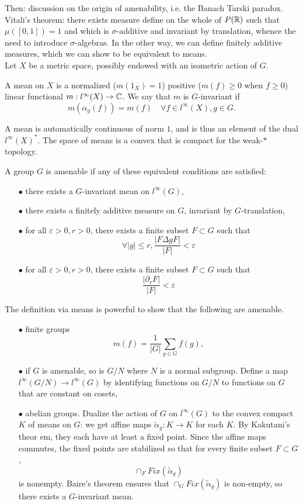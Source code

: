 Then: discussion on the origin of amenability, i.e. the Banach Tarski paradox. Vitali's theorem: there exists measure define on the whole of $P(\mathbb R)$ such that $\mu([0,1]) = 1$ and which is $\sigma$-additive and invariant by translation, whence the need to introduce $\sigma$-algebras. In the other way, we can define finitely additive measures, which we can show to be equivalent to means.\\

Let $X$ be a metric space, possibly endowed with an isometric action of $G$.

\begin{definition}
A mean on $X$ is a normalized ($m(1_X)=1$) positive ($m(f)\geq 0$ when $f\geq 0$) linear functional $m: l^\infty(X)\rightarrow \mathbb C$. We say that $m$ is $G$-invariant if 
\[m(\alpha_g(f))=m(f) \quad \forall f\in l^\infty (X), g\in G.\] 
\end{definition}

A mean is automatically continuous of norm $1$, and is thus an element of the dual $l^\infty(X)^*$. The space of means is a convex that is compact for the weak-$*$ topology.

\begin{definition}
A group $G$ is amenable if any of these equivalent conditions are satisfied:
\begin{itemize}
\item[$\bullet$] there exists a $G$-invariant mean on $l^\infty(G)$,
\item[$\bullet$] there exists a finitely additive measure on $G$, invariant by $G$-translation, 
\item[$\bullet$] for all $\varepsilon>0, r>0$, there exists a finite subset $F \subset G$ such that 
\[ \forall |g|\leq r, \frac{|F\Delta gF|}{|F|}< \varepsilon\]
\item[$\bullet$] for all $\varepsilon>0, r>0$, there exists a finite subset $F \subset G$ such that
\[\frac{|\partial_r F|}{|F|}<\varepsilon\]
\end{itemize}
\end{definition}

The definition via means is powerful to show that the following are amenable.
\begin{itemize}
\item[$\bullet$] finite groups
\[m(f)=\frac{1}{|G|}\sum_{g\in G} f(g),\]
\item[$\bullet$] if $G$ is amenable, so is $G/N$ where $N$ is a normal subgroup. Define a map $l^{\infty}(G/N)\rightarrow l^\infty(G)$ by identifying functions on $G/N$ to functions on $G$ that are constant on cosets,
\item[$\bullet$] abelian groups. Dualize the action of $G$ on $l^\infty(G)$ to the convex compact $K$ of means on $G$: we get affine maps $\tilde \alpha_g : K\rightarrow K$ for each $K$. By Kakutani's theor	em, they each have at least a fixed point. Since the affine maps commutes, the fixed points are stabilized so that for every finite subset $F\subset G$,
\[\cap_F Fix(\tilde \alpha_g)\]
is nonempty. Baire's theorem ensures that $\cap_G Fix(\tilde \alpha_g)$ is non-empty, so there exists a $G$-invariant mean.
\end{itemize} 

